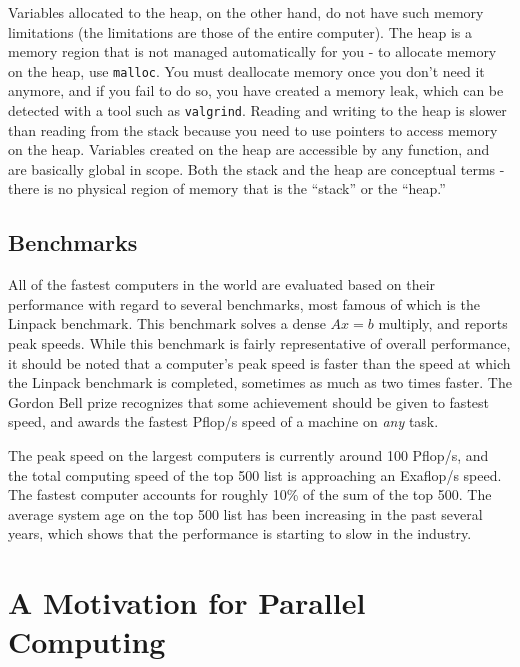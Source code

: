 \documentclass[10pt]{article}
\begin{document}
\begin{flushleft}
Variables allocated to the heap, on the other hand, do not have such memory limitations (the limitations are those of the entire computer). The heap is a memory region that is not managed automatically for you - to allocate memory on the heap, use {\tt malloc}. You must deallocate memory once you don't need it anymore, and if you fail to do so, you have created a memory leak, which can be detected with a tool such as {\tt valgrind}. Reading and writing to the heap is slower than reading from the stack because you need to use pointers to access memory on the heap. Variables created on the heap are accessible by any function, and are basically global in scope. Both the stack and the heap are conceptual terms - there is no physical region of memory that is the ``stack'' or the ``heap.''

\subsection{Benchmarks}

All of the fastest computers in the world are evaluated based on their performance with regard to several benchmarks, most famous of which is the Linpack benchmark. This benchmark solves a dense \(Ax=b\) multiply, and reports peak speeds. While this benchmark is fairly representative of overall performance, it should be noted that a computer's peak speed is faster than the speed at which the Linpack benchmark is completed, sometimes as much as two times faster. The Gordon Bell prize recognizes that some achievement should be given to fastest speed, and awards the fastest Pflop/s speed of a machine on \textit{any} task.

The peak speed on the largest computers is currently around 100 Pflop/s, and the total computing speed of the top 500 list is approaching an Exaflop/s speed. The fastest computer accounts for roughly 10\% of the sum of the top 500. The average system age on the top 500 list has been increasing in the past several years, which shows that the performance is starting to slow in the industry.

\section{A Motivation for Parallel Computing}


\end{flushleft}
\end{document}
